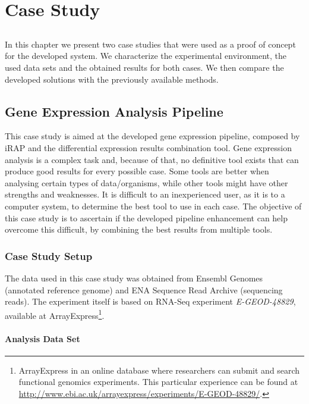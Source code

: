 \chapter{Case Study} \label{chap:casestudy}

\section*{}

In this chapter we present two case studies that were used as a proof of concept
for the developed system. We characterize the experimental environment, the used
data sets and the obtained results for both cases. We then compare the developed
solutions with the previously available methods.

\section{Gene Expression Analysis Pipeline}

This case study is aimed at the developed gene expression pipeline, composed by
iRAP and the differential expression results combination tool. Gene expression
analysis is a complex task and, because of that, no definitive tool exists that
can produce good results for every possible case. Some tools are better when
analysing certain types of data/organisms, while other tools might have other
strengths and weaknesses. It is difficult to an inexperienced user, as it is to
a computer system, to determine the best tool to use in each case. The objective
of this case study is to ascertain if the developed pipeline enhancement can
help overcome this difficult, by combining the best results from multiple tools.

\subsection{Case Study Setup}

The data used in this case study was obtained from Ensembl Genomes (annotated
reference genome) and ENA Sequence Read Archive (sequencing reads). The
experiment itself is based on RNA-Seq experiment
\emph{E-GEOD-48829},
available at ArrayExpress\footnote{ArrayExpress in an online database where
researchers can submit and search functional genomics experiments. This
particular experience can be found at \url{http://www.ebi.ac.uk/arrayexpress/experiments/E-GEOD-48829/}.}.

\subsubsection*{Analysis Data Set}

